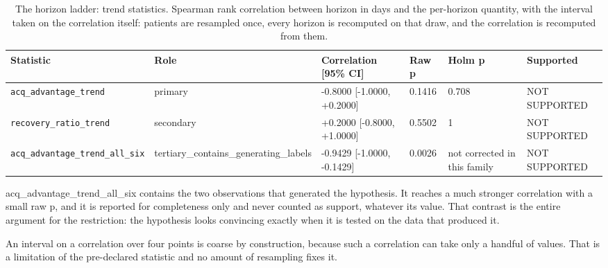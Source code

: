 \begin{table}[t]
\centering
\small
\caption{The horizon ladder: trend statistics. Spearman rank correlation between horizon in days and the per-horizon quantity, with the interval taken on the correlation itself: patients are resampled once, every horizon is recomputed on that draw, and the correlation is recomputed from them.}
\label{tab:trends}
\begin{tabular}{llllll}
\toprule
Statistic & Role & Correlation [95\% CI] & Raw p & Holm p & Supported \\
\midrule
\texttt{acq\_advantage\_trend} & primary & -0.8000 [-1.0000, +0.2000] & 0.1416 & 0.708 & NOT SUPPORTED \\
\texttt{recovery\_ratio\_trend} & secondary & +0.2000 [-0.8000, +1.0000] & 0.5502 & 1 & NOT SUPPORTED \\
\texttt{acq\_advantage\_trend\_all\_six} & tertiary\_contains\_generating\_labels & -0.9429 [-1.0000, -0.1429] & 0.0026 & not corrected in this family & NOT SUPPORTED \\
\bottomrule
\end{tabular}
\par\footnotesize acq\_advantage\_trend\_all\_six contains the two observations that generated the hypothesis. It reaches a much stronger correlation with a small raw p, and it is reported for completeness only and never counted as support, whatever its value. That contrast is the entire argument for the restriction: the hypothesis looks convincing exactly when it is tested on the data that produced it.
\par\footnotesize An interval on a correlation over four points is coarse by construction, because such a correlation can take only a handful of values. That is a limitation of the pre-declared statistic and no amount of resampling fixes it.
\end{table}

